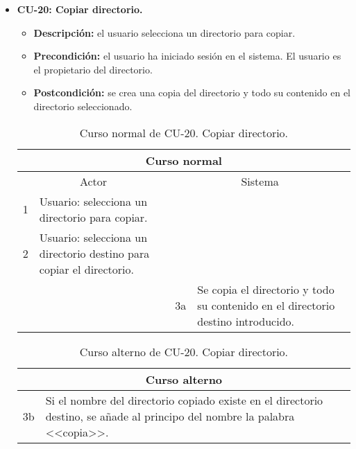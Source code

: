 \begin{itemize}
	\item \textbf{CU-20: Copiar directorio.}
	\begin{itemize}
		\item \textbf{Descripción:} el usuario selecciona un directorio para copiar.
		\item \textbf{Precondición:} el usuario ha iniciado sesión en el sistema. El usuario es el propietario del directorio.
		\item \textbf{Postcondición:} se crea una copia del directorio y todo su contenido en el directorio seleccionado.
	\end{itemize}
	\begin{table}[H]
		\centering
		\begin{tabular}{|p{0.3cm}|p{5cm}|p{0.3cm}|p{5cm}|}
			\hline
			\multicolumn{4}{|c|}{Curso normal} \\ \hline
			\multicolumn{2}{|c|}{Actor} & \multicolumn{2}{|c|}{Sistema} \\ \hline
			1 & Usuario: selecciona un directorio para copiar. &  &  \\ \hline
			2 & Usuario: selecciona un directorio destino para copiar el directorio. &  &  \\ \hline
			&  & 3a & Se copia el directorio y todo su contenido en el directorio destino introducido. \\ \hline
		\end{tabular}
		\caption{Curso normal de CU-20. Copiar directorio.}
		\label{tabla:cu20-normal}
	\end{table}
	
	\begin{table}[H]
		\centering
		\begin{tabular}{|p{0.3cm}|p{10cm}|}
			\hline
			\multicolumn{2}{|c|}{Curso alterno} \\ \hline
			3b & Si el nombre del directorio copiado existe en el directorio destino, se añade al principo del nombre la palabra <<copia>>. \\ \hline
		\end{tabular}
		\caption{Curso alterno de CU-20. Copiar directorio.}
		\label{tabla:cu20-alterno}
	\end{table}
\end{itemize}

